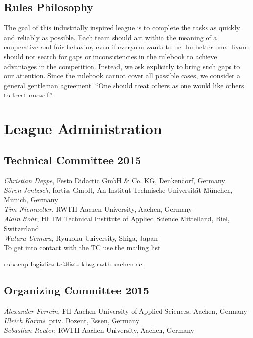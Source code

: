 \documentclass[12pt,twoside]{article}
\begin{document}
\subsection{Rules Philosophy}
\label{sec:rules-philosphy}
The goal of this industrially inspired league is to complete the tasks
as quickly and reliably as possible. Each team should act within the
meaning of a cooperative and fair behavior, even if everyone wants to
be the better one. Teams should not search for gaps or inconsistencies
in the rulebook to achieve advantages in the competition. Instead, we
ask explicitly to bring such gaps to our attention. Since the rulebook
cannot cover all possible cases, we consider a general gentleman
agreement: ``One should treat others as one would like others to treat
oneself''.


\section{League Administration} \label{sec:commitees}
\subsection{Technical Committee 2015} \label{sec:tc}
\emph{Christian Deppe}, Festo Didactic GmbH \& Co. KG, Denkendorf, Germany\\
\emph{S\"oren Jentzsch}, fortiss GmbH, An-Institut Technische Universit\"at M\"unchen, Munich, Germany\\
\emph{Tim Niemueller}, RWTH Aachen University, Aachen, Germany\\
\emph{Alain Rohr}, HFTM Technical Institute of Applied Science Mittelland, Biel, Switzerland\\
\emph{Wataru Uemura}, Ryukoku University, Shiga, Japan\\

\noindent
To get into contact with the TC use the mailing list\\
\centerline{\url{robocup-logistics-tc@lists.kbsg.rwth-aachen.de}}

\subsection{Organizing Committee 2015} \label{sec:oc} 
\emph{Alexander Ferrein}, FH Aachen University of Applied Sciences, Aachen, Germany\\
\emph{Ulrich Karras}, priv. Dozent, Essen, Germany\\
\emph{Sebastian Reuter}, RWTH Aachen University, Aachen, Germany\\
\end{document}
